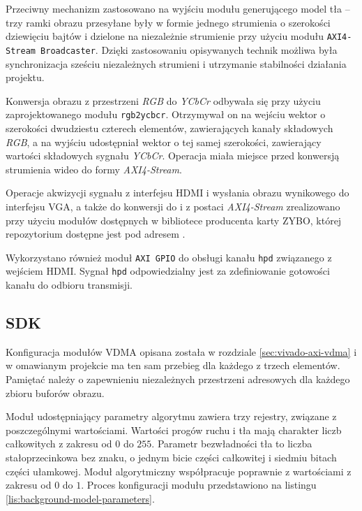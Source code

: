 Przeciwny mechanizm zastosowano na wyjściu modułu generującego model tła -- trzy ramki obrazu przesyłane były w formie jednego strumienia o szerokości dziewięciu bajtów i dzielone na niezależnie strumienie przy użyciu modułu \texttt{AXI4-Stream Broadcaster}. Dzięki zastosowaniu opisywanych technik możliwa była synchronizacja sześciu niezależnych strumieni i utrzymanie stabilności działania projektu.

Konwersja obrazu z przestrzeni \emph{RGB} do \emph{YCbCr} odbywała się przy użyciu zaprojektowanego modułu \texttt{rgb2ycbcr}. Otrzymywał on na wejściu wektor o szerokości dwudziestu czterech elementów, zawierających kanały składowych \emph{RGB}, a na wyjściu udostępniał wektor o tej samej szerokości, zawierający wartości składowych sygnału \emph{YCbCr}. Operacja miała miejsce przed konwersją strumienia wideo do formy \emph{AXI4-Stream}.

Operacje akwizycji sygnału z interfejsu HDMI i wysłania obrazu wynikowego do interfejsu VGA, a także do konwersji do i z postaci \emph{AXI4-Stream} zrealizowano przy użyciu modułów dostępnych w bibliotece producenta karty ZYBO, której repozytorium dostępne jest pod adresem \cite{vivado-library}.

Wykorzystano również moduł \texttt{AXI GPIO} do obsługi kanału \texttt{hpd} związanego z wejściem HDMI. Sygnał \texttt{hpd} odpowiedzialny jest za zdefiniowanie gotowości kanału do odbioru transmisji.



\subsection{SDK}

Konfiguracja modułów VDMA opisana została w rozdziale \ref{sec:vivado-axi-vdma} i w omawianym projekcie ma ten sam przebieg dla każdego z trzech elementów. 
Pamiętać należy o zapewnieniu niezależnych przestrzeni adresowych dla każdego zbioru buforów obrazu.

Moduł udostępniający parametry algorytmu zawiera trzy rejestry, związane z poszczególnymi wartościami. 
Wartości progów ruchu i tła mają charakter liczb całkowitych z zakresu od $0$ do $255$. 
Parametr bezwładności tła to liczba stałoprzecinkowa bez znaku, o jednym bicie części całkowitej i siedmiu bitach części ułamkowej. 
Moduł algorytmiczny współpracuje poprawnie z wartościami z zakresu od $0$ do $1$. 
Proces konfiguracji modułu przedstawiono na listingu \ref{lis:background-model-parameters}.

